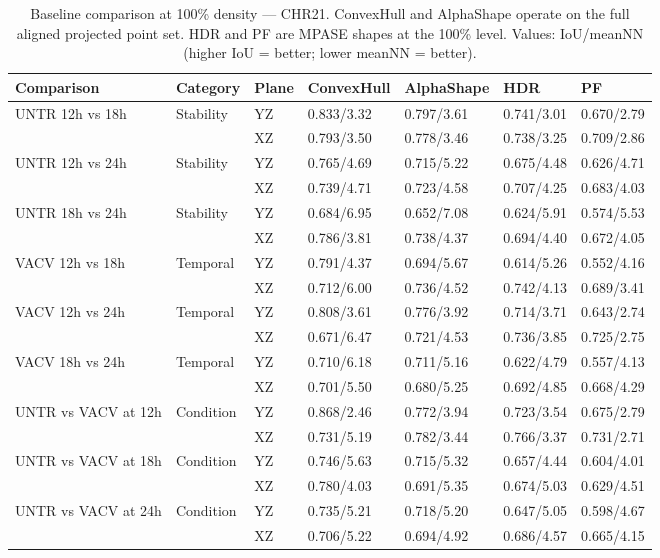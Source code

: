 \begin{table}[ht]
\centering
\small
\caption{Baseline comparison at 100\% density --- CHR21. ConvexHull and AlphaShape operate on the full aligned projected point set. HDR and PF are MPASE shapes at the 100\% level. Values: IoU/meanNN (higher IoU = better; lower meanNN = better).}
\label{tab:baseline_100_chr21}
\begin{tabular}{llllll}
\toprule
Comparison & Category & Plane & ConvexHull & AlphaShape & HDR & PF \\
\midrule
UNTR 12h vs 18h & Stability & YZ & 0.833/3.32 & 0.797/3.61 & 0.741/3.01 & 0.670/2.79 \\
 &  & XZ & 0.793/3.50 & 0.778/3.46 & 0.738/3.25 & 0.709/2.86 \\
UNTR 12h vs 24h & Stability & YZ & 0.765/4.69 & 0.715/5.22 & 0.675/4.48 & 0.626/4.71 \\
 &  & XZ & 0.739/4.71 & 0.723/4.58 & 0.707/4.25 & 0.683/4.03 \\
UNTR 18h vs 24h & Stability & YZ & 0.684/6.95 & 0.652/7.08 & 0.624/5.91 & 0.574/5.53 \\
 &  & XZ & 0.786/3.81 & 0.738/4.37 & 0.694/4.40 & 0.672/4.05 \\
VACV 12h vs 18h & Temporal & YZ & 0.791/4.37 & 0.694/5.67 & 0.614/5.26 & 0.552/4.16 \\
 &  & XZ & 0.712/6.00 & 0.736/4.52 & 0.742/4.13 & 0.689/3.41 \\
VACV 12h vs 24h & Temporal & YZ & 0.808/3.61 & 0.776/3.92 & 0.714/3.71 & 0.643/2.74 \\
 &  & XZ & 0.671/6.47 & 0.721/4.53 & 0.736/3.85 & 0.725/2.75 \\
VACV 18h vs 24h & Temporal & YZ & 0.710/6.18 & 0.711/5.16 & 0.622/4.79 & 0.557/4.13 \\
 &  & XZ & 0.701/5.50 & 0.680/5.25 & 0.692/4.85 & 0.668/4.29 \\
UNTR vs VACV at 12h & Condition & YZ & 0.868/2.46 & 0.772/3.94 & 0.723/3.54 & 0.675/2.79 \\
 &  & XZ & 0.731/5.19 & 0.782/3.44 & 0.766/3.37 & 0.731/2.71 \\
UNTR vs VACV at 18h & Condition & YZ & 0.746/5.63 & 0.715/5.32 & 0.657/4.44 & 0.604/4.01 \\
 &  & XZ & 0.780/4.03 & 0.691/5.35 & 0.674/5.03 & 0.629/4.51 \\
UNTR vs VACV at 24h & Condition & YZ & 0.735/5.21 & 0.718/5.20 & 0.647/5.05 & 0.598/4.67 \\
 &  & XZ & 0.706/5.22 & 0.694/4.92 & 0.686/4.57 & 0.665/4.15 \\
\bottomrule
\end{tabular}
\end{table}